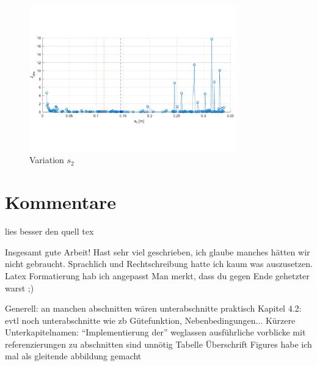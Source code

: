 \begin{figure}
	\centering
		\includegraphics[width=0.8\textwidth]{Bilder/Trajektorien/s2.pdf}
	\caption{Variation $s_2$}
	\label{fig:s2}
\end{figure}




\chapter{Kommentare}
lies besser den quell tex

Insgesamt gute Arbeit!
Hast sehr viel geschrieben, ich glaube manches hätten wir nicht gebraucht.
Sprachlich und Rechtschreibung hatte ich kaum was auszusetzen.
Latex Formatierung hab ich angepasst
Man merkt, dass du gegen Ende gehetzter warst ;)

Generell: an manchen abschnitten wären unterabschnitte praktisch
Kapitel 4.2: evtl noch unterabschnitte wie zb Gütefunktion, Nebenbedingungen...
Kürzere Unterkapitelnamen:  "`Implementierung der"' weglassen
ausführliche vorblicke mit referenzierungen zu abschnitten sind unnötig
 Tabelle Überschrift
 Figures habe ich mal als gleitende abbildung gemacht


